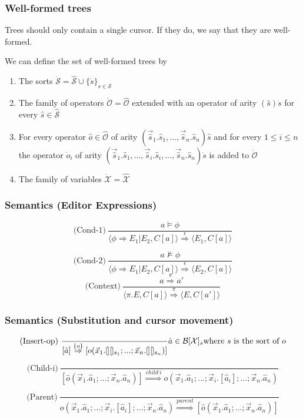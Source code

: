 \documentclass[t,24pt,serif,aspectratio=169]{beamer}
\newcommand{\cleftsemicirc}{\put(3.5,2.5){\oval(5,10)[l]}\put(3.5,-2.5){\line(0,0){10}}\phantom{\circ}}
\newcommand{\crightsemicirc}{\put(1.5,2.5){\oval(5,10)[r]}\put(1.5,-2.5){\line(0,0){10}}\phantom{\circ}}
\newcommand{\hole}{\cleftsemicirc \crightsemicirc}
\begin{document}
\begin{frame}
    \frametitle{Well-formed trees}

    Trees should only contain a single cursor. If they do, we say that
    they are \alert{well-formed}.

    We can define the set of well-formed trees by
    
    \begin{enumerate}
        \item The sorts $\dot{\mathcal{S}} = \hat{\mathcal{S}} \cup \{ \dot{s} \}_{s \in \mathcal{S}}$
        \item The family of operators $\dot{\mathcal{O}} = \hat{\mathcal{O}}$ extended with an operator of arity $(\hat{s})\dot{s}$ for every $\hat{s} \in \hat{\mathcal{S}}$
        \item For every operator $\hat{o} \in \hat{\mathcal{O}}$ of arity $(\vec{\hat{s}}_1.\hat{s}_1,...,\vec{\hat{s}}_n.\hat{s}_n)\hat{s}$ and for every $1 \leq i \leq n$ the operator $\dot{o}_i$ of arity $(\vec{\hat{s}}_1.\hat{s}_1,...,\vec{\hat{s}}_i.\hat{s}_i,...,\vec{\hat{s}}_n.\hat{s}_n)\dot{s}$ is added to $\dot{\mathcal{O}}$
        \item The family of variables $\dot{\mathcal{X}} = \hat{\mathcal{X}}$
    \end{enumerate}
\end{frame}

\begin{frame}
    \frametitle{Semantics (Editor Expressions)}

    \[
        \text{(Cond-1)} \ \frac{a \models \phi}{\langle \phi \Rightarrow E_1|E_2, C[a] \rangle \stackrel{\epsilon}{\Rightarrow} \langle E_1, C[a] \rangle}
    \]

    \[
        \text{(Cond-2)} \ \frac{a \not\models \phi}{\langle \phi \Rightarrow E_1|E_2, C[a] \rangle \stackrel{\epsilon}{\Rightarrow} \langle E_2, C[a] \rangle}
    \]
    \[
        \text{(Context)} \ \frac{a \stackrel{\pi}{\Rightarrow} a'}{\langle \pi.E,C[a] \rangle \stackrel{\pi}{\Rightarrow} \langle E,C[a'] \rangle}
    \]
\end{frame}

\begin{frame}
    \frametitle{Semantics (Substitution and cursor movement)}
    \[
        \text{(Insert-op)} \ \frac{}{[\hat{a}] \stackrel{\{ o \}}{\Rightarrow} [o(\vec{x}_1.\hole_{s_1};...;\vec{x}_n.\hole_{s_n})]} \hat{a} \in \mathcal{B}[\mathcal{X}]_s \text{where } s \text{ is the sort of } o
    \]

    \vspace{1cm}

    \[
        \text{(Child-i)} \ \frac{}{[\hat{o}(\vec{x}_1.\hat{a}_1;...;\vec{x}_n.\hat{a}_n)] \stackrel{child \ i}{\Rightarrow} o(\vec{x}_1.\hat{a}_1;...;\vec{x}_i.[\hat{a}_i];...;\vec{x}_n.\hat{a}_n)}
    \]

    \[
        \text{(Parent)} \ \frac{}{o(\vec{x}_1.\hat{a}_1;...;\vec{x}_i.[\hat{a}_i];...;\vec{x}_n.\hat{a}_n) \stackrel{parent}{\Rightarrow} [\hat{o}(\vec{x}_1.\hat{a}_1;...;\vec{x}_n.\hat{a}_n)]}
    \]
\end{frame}
\end{document}
